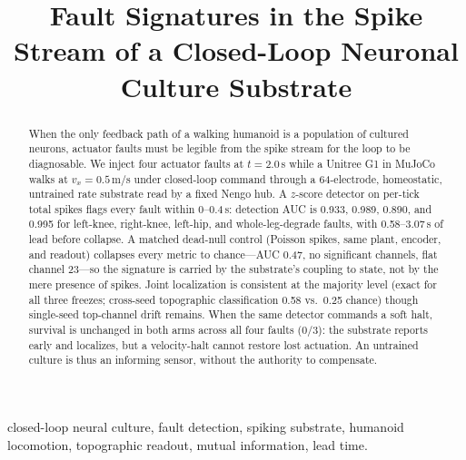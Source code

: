 
\usepackage{cite}
\usepackage{amsmath,amsfonts,amssymb}
\usepackage{graphicx}
\usepackage{textcomp}
\usepackage{booktabs}
\usepackage{array}
\usepackage{multirow}
\usepackage{url}
\usepackage[margin=0.75in, top=1in]{geometry}

\title{Fault Signatures in the Spike Stream of a Closed-Loop Neuronal
Culture Substrate}

\AuthorsBlock



\maketitle

\begin{abstract}
When the only feedback path of a walking humanoid is a population of cultured
neurons, actuator faults must be legible from the spike stream for the loop to
be diagnosable. We inject four actuator faults at $t = 2.0$\,s while a Unitree
G1 in MuJoCo walks at $v_x = 0.5$\,m/s under closed-loop command through a
64-electrode, homeostatic, untrained rate substrate read by a fixed Nengo hub.
A $z$-score detector on per-tick total spikes flags every fault within
0--0.4\,s: detection AUC is 0.933, 0.989, 0.890, and 0.995 for left-knee,
right-knee, left-hip, and whole-leg-degrade faults, with 0.58--3.07\,s of lead
before collapse. A matched dead-null control (Poisson spikes, same plant,
encoder, and readout) collapses every metric to chance---AUC 0.47, no
significant channels, flat channel 23---so the signature is carried by the
substrate's coupling to state, not by the mere presence of spikes. Joint
localization is consistent at the majority level (exact for all three freezes;
cross-seed topographic classification 0.58 vs.\ 0.25 chance) though single-seed
top-channel drift remains. When the same detector commands a soft halt,
survival is unchanged in both arms across all four faults (0/3): the substrate
reports early and localizes, but a velocity-halt cannot restore lost
actuation. An untrained culture is thus an informing sensor, without the
authority to compensate.
\end{abstract}

\begin{IEEEkeywords}
closed-loop neural culture, fault detection, spiking substrate, humanoid
locomotion, topographic readout, mutual information, lead time.
\end{IEEEkeywords}

